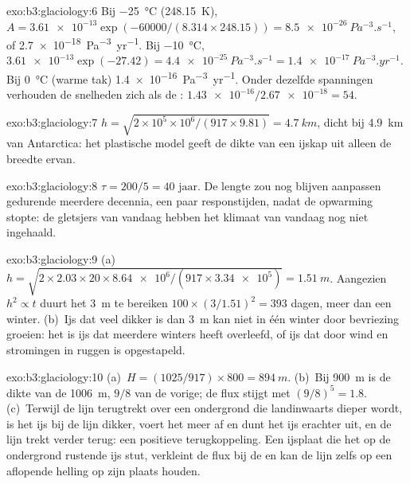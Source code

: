 \begin{solution}{exo:b3:glaciology:6}
Bij \qty{-25}{\celsius} (\qty{248.15}{K}), $A = \num{3.61e-13}\exp(-60000/
(8.314\times248.15)) = \qty{8.5e-26}{Pa^{-3}.s^{-1}}$, of
\qty{2.7e-18}{Pa^{-3}.yr^{-1}}. Bij \qty{-10}{\celsius}, $\num{3.61e-13}
\exp(-27.42) = \qty{4.4e-25}{Pa^{-3}.s^{-1}} = \qty{1.4e-17}{Pa^{-3}.yr^{-1}}$.
Bij \qty{0}{\celsius} (warme tak) \qty{1.4e-16}{Pa^{-3}.yr^{-1}}. Onder
dezelfde spanningen verhouden de snelheden zich als de :
$\num{1.43e-16}/\num{2.67e-18} = 54$.
\end{solution}

\begin{solution}{exo:b3:glaciology:7}
$h = \sqrt{2\times10^5\times10^6/(917\times9.81)} = \qty{4.7}{km}$, dicht bij
\qty{4.9}{km} van Antarctica: het plastische model geeft de dikte van een
ijskap uit alleen de breedte ervan.
\end{solution}

\begin{solution}{exo:b3:glaciology:8}
$\tau = 200/5 = \num{40}\text{ jaar}$. De lengte zou nog blijven aanpassen gedurende
meerdere decennia, een paar responstijden, nadat de opwarming stopte: de gletsjers van vandaag
hebben het klimaat van vandaag nog niet ingehaald.
\end{solution}

\begin{solution}{exo:b3:glaciology:9}
(a)~$h = \sqrt{2\times2.03\times20\times\num{8.64e6}/(917\times\num{3.34e5})}
= \qty{1.51}{m}$. Aangezien $h^2 \propto t$ duurt het \qty{3}{m} te bereiken $100\times
(3/1.51)^2 = 393$ dagen, meer dan een winter. (b)~Ijs dat veel dikker is dan
\qty{3}{m} kan niet in één winter door bevriezing groeien: het is ijs dat
meerdere winters heeft overleefd, of ijs dat door wind en stromingen in ruggen is opgestapeld.
\end{solution}

\begin{solution}{exo:b3:glaciology:10}
(a)~$H = (1025/917)\times800 = \qty{894}{m}$. (b)~Bij \qty{900}{m} is de
dikte van de  \qty{1006}{m}, $9/8$ van de vorige; de flux
stijgt met $(9/8)^5 = 1.8$. (c)~Terwijl de lijn terugtrekt over een ondergrond die
landinwaarts dieper wordt, is het ijs bij de lijn dikker, voert het meer af en dunt het ijs
erachter uit, en de lijn trekt verder terug: een positieve terugkoppeling. Een ijsplaat
die het op de ondergrond rustende ijs stut, verkleint de flux bij de  en kan
de lijn zelfs op een aflopende helling op zijn plaats houden.
\end{solution}

